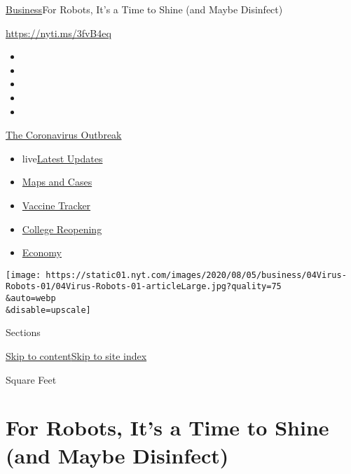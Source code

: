 \href{/section/business}{Business}\textbar{}For Robots, It's a Time to
Shine (and Maybe Disinfect)

\url{https://nyti.ms/3fvB4eq}

\begin{itemize}
\item
\item
\item
\item
\item
\end{itemize}

\href{https://www.nytimes.com/news-event/coronavirus?action=click\&pgtype=Article\&state=default\&region=TOP_BANNER\&context=storylines_menu}{The
Coronavirus Outbreak}

\begin{itemize}
\tightlist
\item
  live\href{https://www.nytimes.com/2020/08/04/world/coronavirus-cases.html?action=click\&pgtype=Article\&state=default\&region=TOP_BANNER\&context=storylines_menu}{Latest
  Updates}
\item
  \href{https://www.nytimes.com/interactive/2020/us/coronavirus-us-cases.html?action=click\&pgtype=Article\&state=default\&region=TOP_BANNER\&context=storylines_menu}{Maps
  and Cases}
\item
  \href{https://www.nytimes.com/interactive/2020/science/coronavirus-vaccine-tracker.html?action=click\&pgtype=Article\&state=default\&region=TOP_BANNER\&context=storylines_menu}{Vaccine
  Tracker}
\item
  \href{https://www.nytimes.com/2020/08/02/us/covid-college-reopening.html?action=click\&pgtype=Article\&state=default\&region=TOP_BANNER\&context=storylines_menu}{College
  Reopening}
\item
  \href{https://www.nytimes.com/live/2020/08/04/business/stock-market-today-coronavirus?action=click\&pgtype=Article\&state=default\&region=TOP_BANNER\&context=storylines_menu}{Economy}
\end{itemize}

\texttt{[image: https://static01.nyt.com/images/2020/08/05/business/04Virus-Robots-01/04Virus-Robots-01-articleLarge.jpg?quality=75\\\&auto=webp\\\&disable=upscale]}

Sections

\protect\hyperlink{site-content}{Skip to
content}\protect\hyperlink{site-index}{Skip to site index}

Square Feet

\hypertarget{for-robots-its-a-time-to-shine-and-maybe-disinfect}{%
\section{For Robots, It's a Time to Shine (and Maybe
Disinfect)}\label{for-robots-its-a-time-to-shine-and-maybe-disinfect}}

